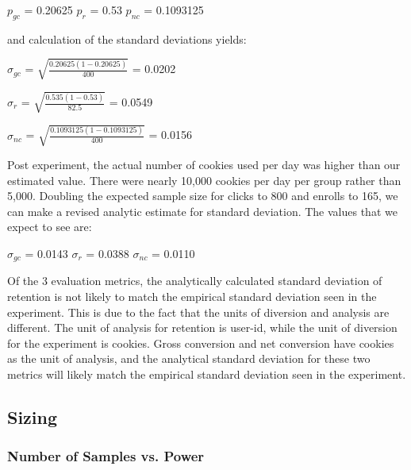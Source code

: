 \documentclass[paper=a4, fontsize=11pt]{scrartcl} %
\numberwithin{equation}{section} %
\numberwithin{figure}{section} %
\numberwithin{table}{section} %
\begin{document}
$p_{gc}$ = 0.20625\newline
$p_{r}$ = 0.53\newline
$p_{nc}$ = 0.1093125
\newline

and calculation of the standard deviations yields: \newline

$\sigma_{gc}$ = $\sqrt{\frac{ 0.20625 (1 -  0.20625)}{400}}$ = 0.0202 \newline

$\sigma_{r}$ = $\sqrt{\frac{ 0.535 (1 -  0.53)}{82.5}}$ = 0.0549 \newline

$\sigma_{nc}$ = $\sqrt{\frac{ 0.1093125 (1 -  0.1093125)}{400}}$ = 0.0156
\newline

Post experiment, the actual number of cookies used per day was higher than our estimated value.  There were nearly 10,000 cookies per day per group rather than 5,000.  Doubling the expected sample size for clicks to 800 and enrolls to 165, we can make a revised analytic estimate for standard deviation.  The values that we expect to see are:
\newline

$\sigma_{gc}$ = 0.0143\newline
$\sigma_{r}$ = 0.0388\newline
$\sigma_{nc}$ = 0.0110
\newline

Of the 3 evaluation metrics, the analytically calculated standard deviation of retention is not likely to match the empirical standard deviation seen in the experiment.  This is due to the fact that the units of diversion and analysis are different.  The unit of analysis for retention is user-id, while the unit of diversion for the experiment is cookies.  Gross conversion and net conversion have cookies as the unit of analysis, and the analytical standard deviation for these two metrics will likely match the empirical standard deviation seen in the experiment. \newline


\subsection{Sizing}

\subsubsection{Number of Samples vs. Power}
\end{document}
